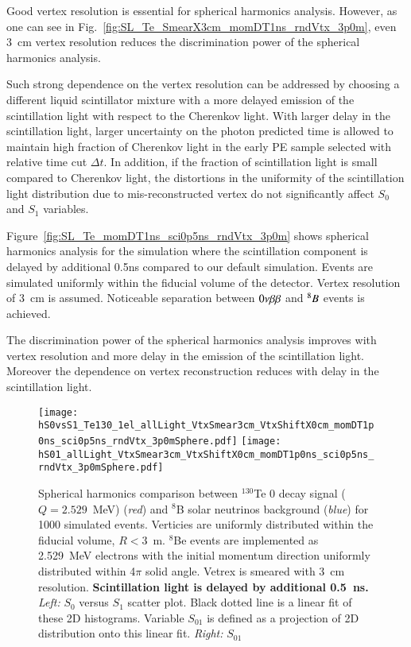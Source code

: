 Good vertex resolution is essential for spherical harmonics analysis. However, as one can see in Fig.~\ref{fig:SL_Te_SmearX3cm_momDT1ns_rndVtx_3p0m}, even 3~cm vertex resolution reduces the discrimination power of the spherical harmonics analysis.

Such strong dependence on the vertex resolution can be
addressed by choosing a different liquid scintillator mixture with a
more delayed emission of the scintillation light with respect to the Cherenkov light. With larger delay in the scintillation light, larger uncertainty on the photon predicted time is allowed to maintain high fraction of Cherenkov light in the early PE sample selected with relative time cut $\Delta t$. In addition, if the fraction of scintillation light is small compared to Cherenkov light, the distortions in the uniformity of the scintillation light distribution due to mis-reconstructed vertex do not significantly affect $S_0$ and $S_1$ variables.

Figure~\ref{fig:SL_Te_momDT1ns_sci0p5ns_rndVtx_3p0m} shows
spherical harmonics analysis for the simulation where the
scintillation component is delayed by additional 0.5ns compared to our default simulation. Events are simulated uniformly within the fiducial volume of the detector. Vertex resolution of 3~cm is assumed. Noticeable separation between $0\nu\beta\beta$ and $^{8}B$ events is achieved.

The discrimination power of the spherical harmonics analysis improves with vertex resolution and more delay in the emission of the scintillation light. Moreover the dependence on vertex reconstruction reduces with delay in the scintillation light. 

\begin{figure*}[h]
  \centering
  \texttt{[image: hS0vsS1\_Te130\_1el\_allLight\_VtxSmear3cm\_VtxShiftX0cm\_momDT1p0ns\_sci0p5ns\_rndVtx\_3p0mSphere.pdf]}
  \texttt{[image: hS01\_allLight\_VtxSmear3cm\_VtxShiftX0cm\_momDT1p0ns\_sci0p5ns\_rndVtx\_3p0mSphere.pdf]}
  \caption{Spherical harmonics comparison between $^{130}$Te 0{\nbb}
    decay signal ($Q=2.529$~MeV) (\emph{red}) and $^{8}$B solar
    neutrinos background (\emph{blue}) for 1000 simulated
    events. Verticies are uniformly distributed within the fiducial
    volume, $R<3$~m. $^8$Be events are implemented as 2.529~MeV
    electrons with the initial momentum direction uniformly
    distributed within 4$\pi$ solid angle. Vetrex is smeared with 3~cm
    resolution. {\bf Scintillation light is delayed by additional
      0.5~ns.} \emph{Left:} $S_0$ versus $S_1$ scatter plot. Black dotted
    line is a linear fit of these 2D histograms. Variable $S_{01}$ is
    defined as a projection of 2D distribution onto this linear
    fit. \emph{Right:} $S_{01}$}
\label{fig:SL_Te_SmearX3cm_momDT1ns_sci0p5ns_rndVtx_3p0m}
\end{figure*}

